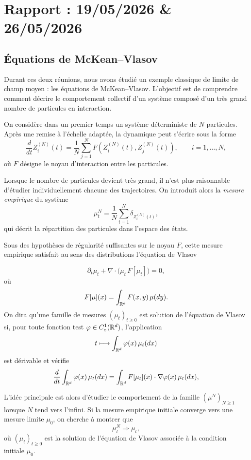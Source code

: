\section{Rapport : 19/05/2026 \& 26/05/2026}
\subsection{Équations de McKean--Vlasov}

Durant ces deux réunions, nous avons étudié un exemple classique de limite de champ moyen : les équations de McKean--Vlasov. L'objectif est de comprendre comment décrire le comportement collectif d'un système composé d'un très grand nombre de particules en interaction.

On considère dans un premier temps un système déterministe de $N$ particules. Après une remise à l'échelle adaptée, la dynamique peut s'écrire sous la forme
\begin{equation}
	\frac{d}{dt} Z_i^{(N)}(t)
	=
	\frac{1}{N}
	\sum_{j=1}^{N}
	F\!\left(
	Z_i^{(N)}(t),
	Z_j^{(N)}(t)
	\right),
	\qquad i=1,\dots,N,
	\label{eq:mean_field}
\end{equation}
où $F$ désigne le noyau d'interaction entre les particules.

Lorsque le nombre de particules devient très grand, il n'est plus raisonnable d'étudier individuellement chacune des trajectoires. On introduit alors la \emph{mesure empirique} du système
\[
	\mu_t^{N}
	=
	\frac1N
	\sum_{i=1}^{N}
	\delta_{Z_i^{(N)}(t)},
\]
qui décrit la répartition des particules dans l'espace des états.

Sous des hypothèses de régularité suffisantes sur le noyau $F$, cette mesure empirique satisfait au sens des distributions l'équation de Vlasov
\begin{important}
	\begin{equation}
		\partial_t \mu_t
		+
		\nabla \cdot
		\bigl(
		\mu_t\,F[\mu_t]
		\bigr)
		=
		0,
		\label{eq:vlasov}
	\end{equation}
	où
	\[
		F[\mu](x)
		=
		\int_{\mathbb{R}^d}
		F(x,y)\,\mu(dy).
	\]
	On dira qu'une famille de mesures $(\mu_t)_{t\geq0}$ est solution de l'équation de Vlasov si, pour toute fonction test $\varphi\in C_c^1(\mathbb{R}^d)$, l'application
	\[
		t\longmapsto \int_{\mathbb{R}^d}\varphi(x)\,\mu_t(dx)
	\]
	est dérivable et vérifie
	\[
		\frac{d}{dt}
		\int_{\mathbb{R}^d}
		\varphi(x)\,\mu_t(dx)
		=
		\int_{\mathbb{R}^d}
		F[\mu_t](x)\cdot \nabla\varphi(x)\,
		\mu_t(dx),
	\]
\end{important}


L'idée principale est alors d'étudier le comportement de la famille
$(\mu^N)_{N\geq 1}$ lorsque $N$ tend vers l'infini. Si la mesure empirique initiale converge vers une mesure limite $\mu_0$, on cherche à montrer que
\[
	\mu_t^N
	\Longrightarrow
	\mu_t,
\]
où $(\mu_t)_{t\geq0}$ est la solution de l'équation de Vlasov associée à la condition initiale $\mu_0$.

